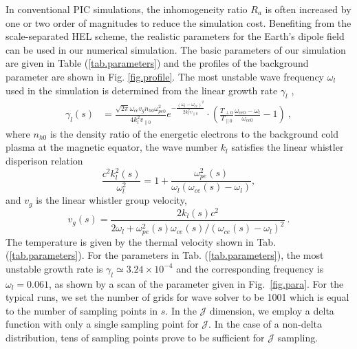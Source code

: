 \documentclass[times,12pt,3p,longtitle]{elsarticle}
\begin{document}
In conventional PIC simulations, the inhomogeneity ratio $R_a$ is often increased by one or two order of magnitudes to reduce the simulation cost.
Benefiting from the scale-separated HEL  scheme,
 the realistic parameters for the Earth's dipole field
can be used in our numerical simulation.
The basic parameters 
of our simulation 
are given in Table (\ref{tab.parameters})
and the profiles of the background parameter are shown in Fig. \ref{fig.profile}.
The most unstable wave frequency $\omega_l$ used in the simulation 
 is determined from the linear growth rate  $\gamma_l$ \cite{gary_1993},
\begin{equation}
\begin{aligned}
    \gamma_l(s) & =\frac{\sqrt{2 \pi} \omega_{ce} v_g n_{h0} \omega_{pe0}^2}{4 k_l^2 v_{ \| 0}} e^{-\frac{\left(\omega_l-\omega_{c e}\right)^2}{2 k_l^2 v_{ \| 0}}}
    \cdot \left( \frac{T_{\perp 0}}{T_{\| 0}} \frac{\omega_{c e 0}-\omega_l}{\omega_{c e 0}}-1\right)~,
    \end{aligned}
\end{equation}
where 
 $n_{h0}$ is the density ratio of the energetic electrons to the background cold plasma at the magnetic equator,
the wave number $k_l$ satisfies the linear whistler disperison relation
\begin{equation}
    \frac{c^2 k_l^2(s)}{\omega_l^2} = 1 + \frac{\omega_{pe}^2(s)}{\omega_l(\omega_{ce}(s)-\omega_l)},
\end{equation}
and $v_g$ is the linear whistler group velocity,
\begin{equation}
    v_g(s) = \frac{2k_l(s)c^2 }{2\omega_l + \omega_{pe}^2(s)\omega_{ce}(s)/(\omega_{ce}(s)-\omega_l)^2}~.
\end{equation}
The temperature is given by the thermal velocity shown in Tab. (\ref{tab.parameters}).
For the  parameters in Tab. (\ref{tab.parameters}), 
the most unstable 
growth rate is $\gamma_l \simeq 3.24\times 10^{-4}$
and the corresponding 
frequency is $\omega_l = 0.061$, as shown by a scan of the parameter given in Fig.~\ref{fig.para}.
For the typical runs, we set the number of grids for wave solver to be 1001
which is equal to  the number of sampling points in $s$.
In the $\mathcal{J}$ dimension, we employ a delta function with only a single sampling point for $\mathcal{J}$. In the case of a non-delta distribution, tens of sampling points prove to be sufficient for $\mathcal{J}$ sampling.
\end{document}
